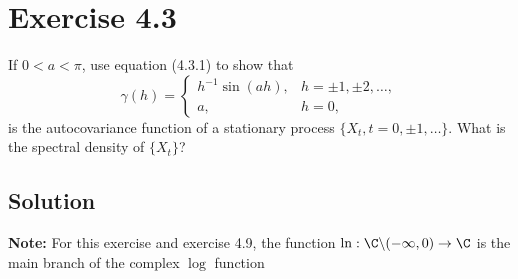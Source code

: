 \section*{Exercise 4.3}

If \(0 < a < \pi\), use equation (4.3.1) to show that
\[
\gamma(h) = 
\begin{cases} 
h^{-1}\sin(ah), & h = \pm 1, \pm 2, \ldots, \\
a, & h = 0,
\end{cases}
\]
is the autocovariance function of a stationary process \(\{X_t, t = 0, \pm 1, \ldots\}\). What is the spectral density of \(\{X_t\}\)?

\subsection*{Solution}

\textbf{Note:} For this exercise and exercise 4.9, the function $\ln:\C\backslash (-\infty,0) \to \C$ is the main branch of the complex $\log$ function 

